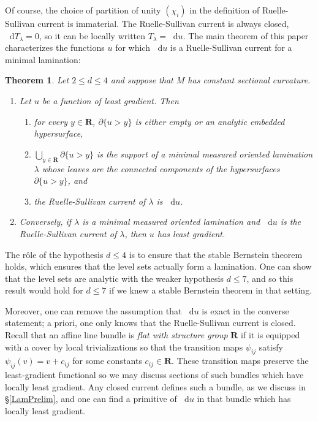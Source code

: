\documentclass[reqno,10pt]{amsart}
\newcommand{\RR}{\mathbf{R}}
\newcommand*\dif{\mathop{}\!\mathrm{d}}
\newcommand{\dfn}[1]{\emph{#1}\index{#1}}
\newtheorem{mainthm}{Theorem}
\theoremstyle{definition}
\numberwithin{equation}{section}
\begin{document}
Of course, the choice of partition of unity $(\chi_i)$ in the definition of Ruelle-Sullivan current is immaterial.
The Ruelle-Sullivan current is always closed, $\dif T_\lambda = 0$, so it can be locally written $T_\lambda = \dif u$.
The main theorem of this paper characterizes the functions $u$ for which $\dif u$ is a Ruelle-Sullivan current for a minimal lamination:

\begin{mainthm}\label{main thm}
Let $2 \leq d \leq 4$ and suppose that $M$ has constant sectional curvature.
\begin{enumerate}
\item Let $u$ be a function of least gradient.
Then
\begin{enumerate}
\item for every $y \in \RR$, $\partial \{u > y\}$ is either empty or an analytic embedded hypersurface,
\item $\bigcup_{y \in \RR} \partial \{u > y\}$ is the support of a minimal measured oriented lamination $\lambda$ whose leaves are the connected components of the hypersurfaces $\partial \{u > y\}$, and
\item the Ruelle-Sullivan current of $\lambda$ is $\dif u$.
\end{enumerate}
\item Conversely, if $\lambda$ is a minimal measured oriented lamination and $\dif u$ is the Ruelle-Sullivan current of $\lambda$, then $u$ has least gradient.
\end{enumerate}
\end{mainthm}

The r\^ole of the hypothesis $d \leq 4$ is to ensure that the stable Bernstein theorem \cite{Chodosh2021} holds, which ensures that the level sets actually form a lamination.
One can show that the level sets are analytic with the weaker hypothesis $d \leq 7$, and so this result would hold for $d \leq 7$ if we knew a stable Bernstein theorem in that setting.

Moreover, one can remove the assumption that $\dif u$ is exact in the converse statement; a priori, one only knows that the Ruelle-Sullivan current is closed.
Recall that an affine line bundle is \dfn{flat with structure group} $\RR$ if it is equipped with a cover by local trivializations so that the transition maps $\psi_{ij}$ satisfy $\psi_{ij}(v) = v + c_{ij}$ for some constants $c_{ij} \in \RR$.
These transition maps preserve the least-gradient functional so we may discuss sections of such bundles which have locally least gradient.
Any closed current defines such a bundle, as we discuss in \S\ref{LamPrelim}, and one can find a primitive of $\dif u$ in that bundle which has locally least gradient.
\end{document}
